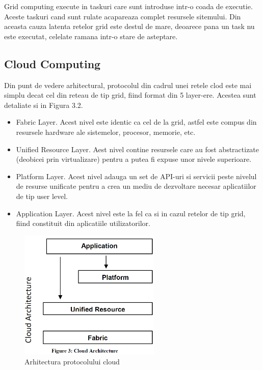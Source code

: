 Grid computing execute in taskuri care sunt introduse intr-o coada de executie. Aceste taskuri cand
sunt rulate acapareaza complet resursele sitemului. Din aceasta cauza latenta retelor grid este
destul de mare, deoarece pana un task nu este executat, celelate ramana intr-o stare de asteptare.

\subsection{Cloud Computing}

Din punt de vedere arhitectural, protocolul din cadrul unei retele clod este mai simplu decat cel
din reteau de tip grid, fiind format din 5 layer-ere. Acestea sunt detaliate si in Figura 3.2.


\begin{itemize}
 
\item Fabric Layer. Acest nivel este identic ca cel de la grid, astfel este compus din resursele hardware ale
    sistemelor, procesor, memorie, etc.
\item Unified Resource Layer. Aest nivel contine resursele care au fost abstractizate (deobicei
    prin virtualizare) pentru a putea fi expuse unor nivele superioare. 
\item Platform Layer. Acest nivel adauga un set de API-uri si servicii peste nivelul de resurse
    unificate pentru a crea un mediu de dezvoltare necesar aplicatiilor de tip user level.
\item Application Layer. Acest nivel este la fel ca si in cazul retelor de tip grid, fiind
    constituit din aplicatiile utilizatorilor.

\end{itemize}


\begin{figure}[ht] \centering
\includegraphics[width=0.6\textwidth]{img/cloud.png}
\caption{Arhitectura protocolului cloud } \end{figure}


